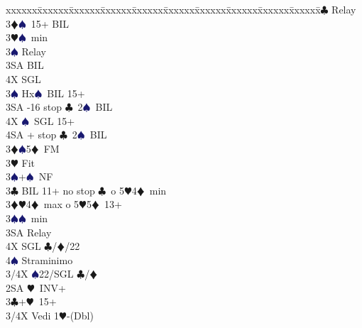 \documentclass[a4paper,italian]{article}
\newcommand{\BC}{\textcolor{OliveGreen}{$\clubsuit$}}
\newcommand{\BD}{\textcolor{RedOrange}{$\vardiamondsuit$}}
\newcommand{\BH}{\textcolor{Red2}{$\varheartsuit${}}}
\newcommand{\BS}{\textcolor{MidnightBlue}{$\spadesuit${}}}
\newenvironment{bidtable}
{\begin{tabbing}

    xxxxxx\=xxxxxx\=xxxxxx\=xxxxxx\=xxxxxx\=xxxxxx\=xxxxxx\=xxxxxx\=xxxxxx\=xxxxxx\=\kill}
{\end{tabbing} }%
\begin{document}
\begin{multicols}{2}
\begin{bidtable}
                                            3\BC \> Relay\+\\
                                            3\BD {}\BS\ 15+ BIL\\
                                            3\BH {}\BS\ min\+\\
                                            3\BS \> Relay\+\\
                                            3SA \> BIL\\
                                            4X \> SGL\-\-\\
                                            3\BS \> Hx\BS\ BIL 15+\\
                                            3SA -16 stop \BC\ 2\BS\ BIL\\
                                            4X \BS\ SGL 15+\\
                                            4SA + stop \BC\ 2\BS\ BIL\-\\
                                            3\BD {}\BS 5\BD\ FM\\
                                            3\BH \> Fit\\
                                            3\BS {}+\BS\ NF\-\\
                                            3\BC \> BIL 11+ no stop \BC\ o 5\BH 4\BD\ min\\
                                            3\BD {}\BH 4\BD\ max o 5\BH 5\BD\ 13+\\
                                            3\BS {}\BS\ min\+\\
                                            3SA \> Relay\+\\
                                            4X \> SGL \BC /\BD /22\\
                                            4\BS \> Straminimo\-\-\\
                                            3/4X \BS 22/SGL \BC /\BD \-\\
                                            2SA \BH\ INV+\+\\
                                            3\BC {}+\BH\ 15+\-\\
                                            3/4X \> Vedi 1\BH -(Dbl)\-
                                        \end{bidtable}
                                        \columnbreak

\end{multicols}
\end{document}
